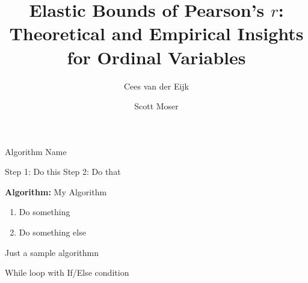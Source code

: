 \documentclass[
  12pt,
]{article}
\title{Elastic Bounds of Pearson's \(r\): Theoretical and Empirical
Insights for Ordinal Variables}
\author{Cees van der Eijk \and Scott Moser}
\date{}
\newenvironment{Shaded}{\begin{snugshade}}{\end{snugshade}}
\newcommand{\NormalTok}[1]{\textcolor[rgb]{0.00,0.23,0.31}{#1}}
\providecommand{\tightlist}{%
  \setlength{\itemsep}{0pt}\setlength{\parskip}{0pt}}\usepackage{longtable,booktabs,array}
\renewcommand*\contentsname{Table of contents}
\newcommand\contentsname{Table of contents}
\begin{document}
\maketitle

\renewcommand*\contentsname{Table of contents}
{
\hypersetup{linkcolor=}
\setcounter{tocdepth}{3}
\tableofcontents
}

\begin{Shaded}
\begin{Highlighting}[]
\NormalTok{Algorithm Name}

\NormalTok{Step 1: Do this  }
\NormalTok{Step 2: Do that  }
\end{Highlighting}
\end{Shaded}

\textbf{Algorithm:} My Algorithm

\begin{enumerate}
\def\labelenumi{\arabic{enumi}.}
\tightlist
\item
  Do something\\
\item
  Do something else\\
\end{enumerate}

Just a sample algorithmn

\begin{algorithm}[H]
\DontPrintSemicolon
\SetAlgoLined
{}
\BlankLine
{}
\caption{While loop with If/Else condition}
\end{algorithm}

\newpage
\end{document}
